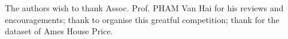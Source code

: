 \documentclass[11pt,a4paper]{article}
\begin{document}
The authors wish to thank Assoc. Prof. PHAM Van Hai for his reviews and encouragements; thank \cite{kaggle} to organise this greatful competition; thank \citet{de2011ames} for the dataset of Ames House Price.











\end{document}

